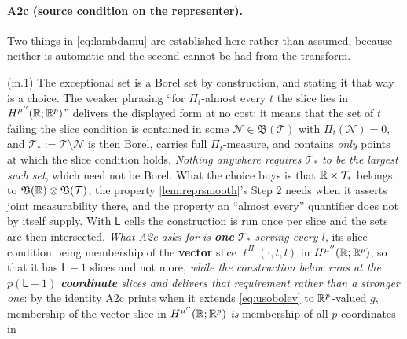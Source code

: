 \paragraph{A2c (source condition on the representer).}


Two things in \eqref{eq:lambdamu} are established here rather than assumed, because neither is
automatic and the second cannot be had from the transform.

\textup{(m.1)} The exceptional set is a Borel set by construction, and stating it that way is a
choice. The weaker phrasing ``for $\Pi_t$-almost every $t$ the slice lies in $H^{\mu''}(\mathbb{R};\mathbb{R}^{p})$''
delivers
the displayed form at no cost: it means that the set of $t$ failing the slice condition is contained in
some $\mathcal N\in\mathfrak B(\mathcal T)$ with $\Pi_t(\mathcal N)=0$, and
$\mathcal T_\ast:=\mathcal T\setminus\mathcal N$ is then Borel, carries full $\Pi_t$-measure, and
contains \emph{only} points at which the slice condition holds. \emph{Nothing anywhere requires
$\mathcal T_\ast$ to be the largest such set}, which need not be Borel. What the choice buys is that
$\mathbb{R}\times\mathcal T_\ast$ belongs to $\mathfrak B(\mathbb{R})\otimes\mathfrak B(\mathcal T)$, the property
\cref{lem:reprsmooth}'s Step 2 needs when it asserts joint measurability there, and the property an
``almost every'' quantifier does not by itself supply.
With $\mathsf L$ cells the construction is run once per slice and the sets are then intersected.
\emph{What A2c asks for is \textbf{one} $\mathcal T_\ast$ serving every $l$}, its slice condition
being membership of the \textbf{vector} slice $\ell^\Pi(\cdot,t,l)$ in $H^{\mu''}(\mathbb{R};\mathbb{R}^{p})$, so that
it has $\mathsf L-1$ slices and not more, \emph{while the construction below runs at the
$p(\mathsf L-1)$ \textbf{coordinate} slices and delivers that requirement rather than a stronger one}:
by the identity A2c prints when it extends \eqref{eq:usobolev} to $\mathbb{R}^{p}$-valued $g$, membership of
the vector slice in $H^{\mu''}(\mathbb{R};\mathbb{R}^{p})$ \emph{is} membership of all $p$ coordinates in
